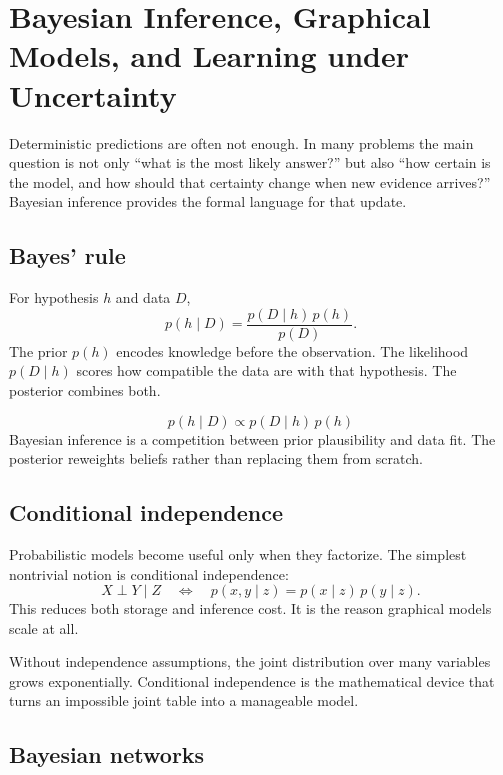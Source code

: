 \chapter{Bayesian Inference, Graphical Models, and Learning under Uncertainty}

Deterministic predictions are often not enough. In many problems the main question is not only ``what is the most likely answer?'' but also ``how certain is the model, and how should that certainty change when new evidence arrives?'' Bayesian inference provides the formal language for that update.

\section{Bayes' rule}

For hypothesis $h$ and data $D$,
\[
  p(h \mid D)
  =
  \frac{p(D \mid h)\,p(h)}{p(D)}.
\]
The prior $p(h)$ encodes knowledge before the observation. The likelihood $p(D \mid h)$ scores how compatible the data are with that hypothesis. The posterior combines both.

\begin{keyequation}
\[
p(h \mid D) \propto p(D \mid h)\, p(h)
\]
\tcblower
Bayesian inference is a competition between prior plausibility and data fit. The posterior reweights beliefs rather than replacing them from scratch.
\end{keyequation}

\section{Conditional independence}

Probabilistic models become useful only when they factorize. The simplest nontrivial notion is conditional independence:
\[
  X \perp Y \mid Z
  \quad \Longleftrightarrow \quad
  p(x,y \mid z) = p(x \mid z)\,p(y \mid z).
\]
This reduces both storage and inference cost. It is the reason graphical models scale at all.

\begin{aside}
Without independence assumptions, the joint distribution over many variables grows exponentially. Conditional independence is the mathematical device that turns an impossible joint table into a manageable model.
\end{aside}

\section{Bayesian networks}

